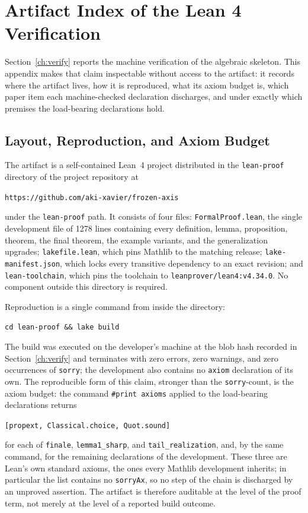 \section{Artifact Index of the Lean 4 Verification}
\label{app:artifact}

Section~\ref{ch:verify} reports the machine verification of the algebraic skeleton. This appendix makes that claim inspectable without access to the artifact: it records where the artifact lives, how it is reproduced, what its axiom budget is, which paper item each machine-checked declaration discharges, and under exactly which premises the load-bearing declarations hold.

\subsection{Layout, Reproduction, and Axiom Budget}

The artifact is a self-contained Lean~4 project distributed in the \texttt{lean-proof} directory of the project repository at
\begin{center}
\texttt{https://github.com/aki-xavier/frozen-axis}
\end{center}
under the \texttt{lean-proof} path. It consists of four files: \texttt{FormalProof.lean}, the single development file of 1278 lines containing every definition, lemma, proposition, theorem, the final theorem, the example variants, and the generalization upgrades; \texttt{lakefile.lean}, which pins Mathlib to the matching release; \texttt{lake-manifest.json}, which locks every transitive dependency to an exact revision; and \texttt{lean-toolchain}, which pins the toolchain to \texttt{leanprover/lean4:v4.34.0}. No component outside this directory is required.

Reproduction is a single command from inside the directory:
\begin{center}
\texttt{cd lean-proof \&\& lake build}
\end{center}
The build was executed on the developer's machine at the blob hash recorded in Section~\ref{ch:verify} and terminates with zero errors, zero warnings, and zero occurrences of \texttt{sorry}; the development also contains no \texttt{axiom} declaration of its own. The reproducible form of this claim, stronger than the \texttt{sorry}-count, is the axiom budget: the command \texttt{\#print axioms} applied to the load-bearing declarations returns
\begin{center}
\texttt{[propext, Classical.choice, Quot.sound]}
\end{center}
for each of \texttt{finale}, \texttt{lemma1\_sharp}, and \texttt{tail\_realization}, and, by the same command, for the remaining declarations of the development. These three are Lean's own standard axioms, the ones every Mathlib development inherits; in particular the list contains no \texttt{sorryAx}, so no step of the chain is discharged by an unproved assertion. The artifact is therefore auditable at the level of the proof term, not merely at the level of a reported build outcome.

